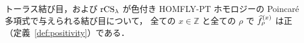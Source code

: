 \begin{tcolorbox}
\begin{conjecture}\label{conj:A}
トーラス結び目，および $\textrm{rCS}_\lambda$ が色付き HOMFLY-PT ホモロジーの Poincaré 多項式で与えられる結び目について，
全ての $x\in\mathbb{Z}$ と全ての $\rho$ で $\widehat{f}^{(x)}_\rho$ は正（定義~\ref{def:positivity}）である．
\end{conjecture}
\end{tcolorbox}
